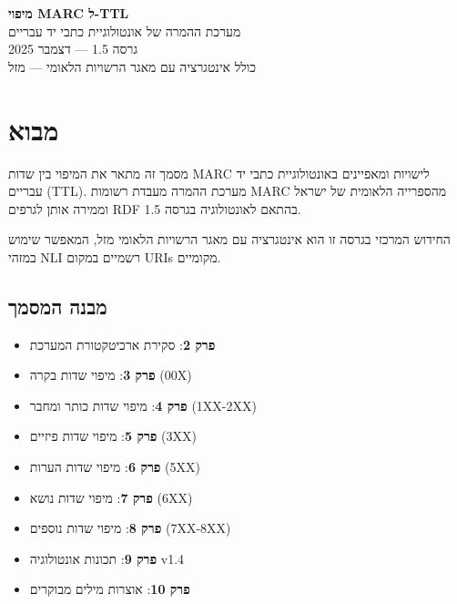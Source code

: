 \documentclass[12pt,a4paper]{article}
\newcommand{\new}[1]{\textcolor{newaddition}{#1}}
\begin{document}
\begin{center}
{\LARGE\bfseries מיפוי MARC ל-TTL}\\[0.5cm]
{\Large מערכת ההמרה של אונטולוגיית כתבי יד עבריים}\\[0.5cm]
{\large גרסה 1.5 — דצמבר 2025}\\[0.3cm]
{\normalsize \new{כולל אינטגרציה עם מאגר הרשויות הלאומי — מזל}}\\[1cm]
\end{center}

\tableofcontents
\newpage

\section{מבוא}

מסמך זה מתאר את המיפוי בין שדות MARC לישויות ומאפיינים באונטולוגיית כתבי יד עבריים \textenglish{(TTL)}. מערכת ההמרה מעבדת רשומות MARC מהספרייה הלאומית של ישראל וממירה אותן לגרפים RDF בהתאם לאונטולוגיה בגרסה 1.5.

\new{החידוש המרכזי בגרסה זו הוא אינטגרציה עם מאגר הרשויות הלאומי מזל, המאפשר שימוש במזהי NLI רשמיים במקום URIs מקומיים.}

\subsection{מבנה המסמך}

\begin{itemize}
\item \textbf{פרק 2}: סקירת ארכיטקטורת המערכת
\item \textbf{פרק 3}: מיפוי שדות בקרה \textenglish{(00X)}
\item \textbf{פרק 4}: מיפוי שדות כותר ומחבר \textenglish{(1XX-2XX)}
\item \textbf{פרק 5}: מיפוי שדות פיזיים \textenglish{(3XX)}
\item \textbf{פרק 6}: מיפוי שדות הערות \textenglish{(5XX)}
\item \textbf{פרק 7}: מיפוי שדות נושא \textenglish{(6XX)}
\item \textbf{פרק 8}: מיפוי שדות נוספים \textenglish{(7XX-8XX)}
\item \textbf{פרק 9}: תכונות אונטולוגיה v1.4
\item \textbf{פרק 10}: אוצרות מילים מבוקרים
\end{itemize}
\end{document}
